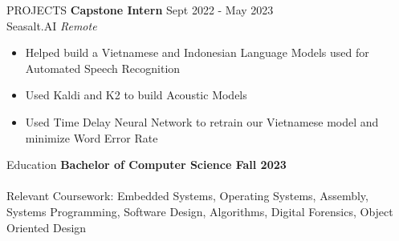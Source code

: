 \documentclass{resume} %
\begin{document}
	\begin{rSection}{PROJECTS}
		\textbf{Capstone Intern} \hfill Sept 2022 - May 2023\\
		Seasalt.AI \hfill \textit{Remote}
		\begin{itemize} \itemsep -5pt {} 
			\item Helped build a Vietnamese and Indonesian Language Models used for Automated Speech Recognition
			\item Used Kaldi and K2 to build Acoustic Models
			\item Used Time Delay Neural Network to retrain our Vietnamese model and minimize Word Error Rate
		\end{itemize}


	\end{rSection} 


	\begin{rSection}{Education}
		{\bf Bachelor of Computer Science \hfill {Fall 2023}}\\
		\\
		Relevant Coursework: Embedded Systems, Operating Systems, Assembly, Systems Programming, Software Design, Algorithms, Digital Forensics, Object Oriented Design
	\end{rSection}

	\vfill
	\begin{center}
	\end{center}
\end{document}
